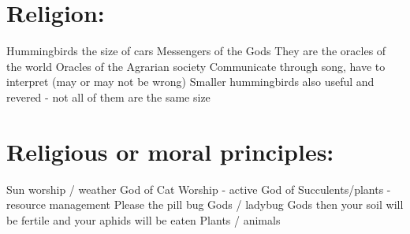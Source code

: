 \documentclass[blue]{GL2020}
\begin{document}
\section*{Religion:}

Hummingbirds the size of cars
Messengers of the Gods
They are the oracles of the world
Oracles of the Agrarian society 
Communicate through song, have to interpret (may or may not be wrong)
Smaller hummingbirds also useful and revered - not all of them are the same size

\section*{Religious or moral principles:}

Sun worship / weather
God of Cat Worship - active
God of Succulents/plants - resource management
Please the pill bug Gods / ladybug Gods then your soil will be fertile and your aphids will be eaten
Plants / animals
\end{document}
